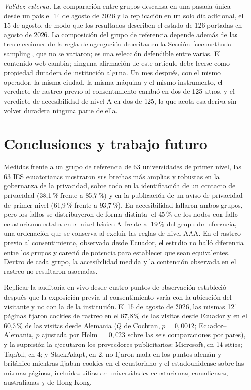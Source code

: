 \documentclass[pdflatex,sn-basic,Numbered,iicol]{sn-jnl}
\theoremstyle{thmstyleone}
\theoremstyle{thmstyletwo}
\theoremstyle{thmstylethree}
\begin{document}
\emph{Validez externa.} La comparaci\'on entre grupos descansa en una pasada \'unica desde un pa\'is el 14 de agosto de 2026 y la replicaci\'on en un solo d\'ia adicional, el 15 de agosto, de modo que los resultados describen el estado de 126 portadas en agosto de 2026. La composici\'on del grupo de referencia depende adem\'as de las tres elecciones de la regla de agregaci\'on descritas en la Secci\'on~\ref{sec:methods-sampling}, que no se variaron; es una selecci\'on defendible entre varias. El contenido web cambia; ninguna afirmaci\'on de este art\'iculo debe leerse como propiedad duradera de instituci\'on alguna. Un mes despu\'es, con el mismo operador, la misma ciudad, la misma m\'aquina y el mismo instrumento, el veredicto de rastreo previo al consentimiento cambi\'o en dos de 125 sitios, y el veredicto de accesibilidad de nivel A en dos de 125, lo que acota esa deriva sin volver duradera ninguna parte de ella.

\section{Conclusiones y trabajo futuro}\label{sec:conclusions}

Medidas frente a un grupo de referencia de 63 universidades de primer nivel, las 63 IES ecuatorianas mostraron sus brechas m\'as amplias y robustas en la gobernanza de la privacidad, sobre todo en la identificaci\'on de un contacto de privacidad (38,1\,\% frente a 85,7\,\%) y en la publicaci\'on de un aviso de privacidad de primer nivel (61,9\,\% frente a 93,7\,\%). En accesibilidad fallaron ambos grupos, pero los fallos se distribuyeron de forma distinta: el 45\,\% de los nodos con fallo ecuatorianos estaba en el nivel b\'asico A frente al 19\,\% del grupo de referencia, una ordenaci\'on que se conserva al excluir las reglas de nivel AAA. En el rastreo previo al consentimiento, observado desde Ecuador, el estudio no hall\'o diferencia entre los grupos y careci\'o de potencia para establecer que sean equivalentes. Dentro de cada grupo, la accesibilidad medida y la contenci\'on observada en el rastreo no resultaron asociadas.

Replicar la auditor\'ia en vivo desde cuatro puntos de observaci\'on estableci\'o despu\'es que la exposici\'on previa al consentimiento var\'ia con la ubicaci\'on del visitante y no con la de la instituci\'on. El 15 de agosto de 2026, las mismas 121 p\'aginas fijaron cookies de rastreo en el 67,8\,\% de las visitas desde Ecuador y en el 60,3\,\% de las visitas desde Alemania ($Q$ de Cochran, $p=0{,}0012$; Ecuador--Alemania, $p$ ajustada por Holm $=0{,}023$ sobre las seis comparaciones por pares), y la supresi\'on la ejecutaron los proveedores publicitarios: Microsoft, en 14 sitios; TapAd, en 4; y StackAdapt, en 2, no fijaron nada en los puntos alem\'an y brit\'anico mientras fijaban cookies en el ecuatoriano y el estadounidense sobre las mismas p\'aginas, incluidos sitios de universidades ecuatorianas, canadienses, australianas y de Hong Kong.
\end{document}
